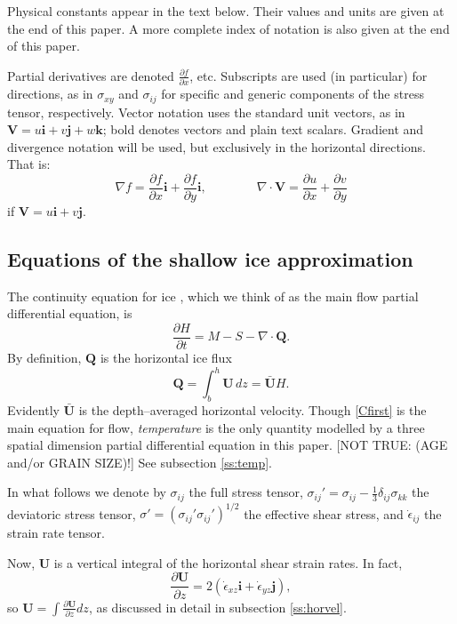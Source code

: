 \documentclass[12pt,final]{amsart}%
\theoremstyle{plain}
\theoremstyle{definition}
\theoremstyle{remark}
\newcommand{\ddt}[1]{\ensuremath{\frac{\partial #1}{\partial t}}}
\newcommand{\ddx}[1]{\ensuremath{\frac{\partial #1}{\partial x}}}
\newcommand{\ddy}[1]{\ensuremath{\frac{\partial #1}{\partial y}}}
\newcommand{\ddz}[1]{\ensuremath{\frac{\partial #1}{\partial z}}}
\newcommand{\diverg}{\nabla\cdot}
\def\eps{\epsilon}
\newcommand{\grad}{\nabla}
\newcommand{\ihat}{\mathbf{i}}
\newcommand{\jhat}{\mathbf{j}}
\newcommand{\khat}{\mathbf{k}}
\newcommand{\bQ}{{\mathbf{Q}}}
\newcommand{\bU}{{\mathbf{U}}}
\newcommand{\bV}{{\mathbf{V}}}
\begin{document}
Physical constants appear in the text below.  Their values and units are given at the end of this paper.  A more complete index of notation is also given at the end of this paper.

Partial derivatives are denoted $\frac{\partial f}{\partial x}$, etc.  Subscripts are used (in particular) for directions, as in $\sigma_{xy}$ and $\sigma_{ij}$ for specific and generic components of the stress tensor, respectively.  Vector notation uses the standard unit vectors, as in $\bV=u\ihat+v\jhat+w\khat$; bold denotes vectors and plain text scalars.  Gradient and divergence notation will be used, but exclusively in the horizontal directions.  That is:
    $$\grad f = \ddx{f} \ihat + \ddy{f} \ihat, \qquad \qquad \diverg \bV = \ddx{u} + \ddy{v}$$
if $\bV=u\ihat+v\jhat$.


\subsection*{Equations of the shallow ice approximation}  The continuity equation for ice \citep{Paterson}, which we think of as the main flow partial differential equation, is
\begin{equation}\label{Cfirst}
\ddt{H} = M - S - \diverg \bQ.
\end{equation}
By definition, $\bQ$ is the horizontal ice flux
\begin{equation}\label{flux}
\bQ = \int_{b}^h \bU\,dz = \bar \bU H.
\end{equation}
Evidently $\bar \bU$ is the depth--averaged horizontal velocity.  Though \eqref{Cfirst} is the main equation for flow, \emph{temperature} is the only quantity modelled by a three spatial dimension partial differential equation in this paper.  [NOT TRUE: (AGE and/or GRAIN SIZE)!]  See subsection \ref{ss:temp}.

In what follows we denote by $\sigma_{ij}$ the full stress tensor, $\sigma_{ij}'= \sigma_{ij}- \frac{1}{3} \delta_{ij} \sigma_{kk}$ the deviatoric stress tensor, $\sigma'= \left(\sigma_{ij}' \sigma_{ij}'\right)^{1/2}$  the effective shear stress, and $\dot \eps_{ij}$ the strain rate tensor.

Now, $\bU$ is a vertical integral of the horizontal shear strain rates.  In fact,
\begin{equation}\label{stressstrain}
\ddz{\bU} = 2(\dot\eps_{xz}\ihat+\dot\eps_{yz}\jhat),
\end{equation}
so $\bU=\int \ddz{\bU} dz$, as discussed in detail in subsection \ref{ss:horvel}.
\end{document}
